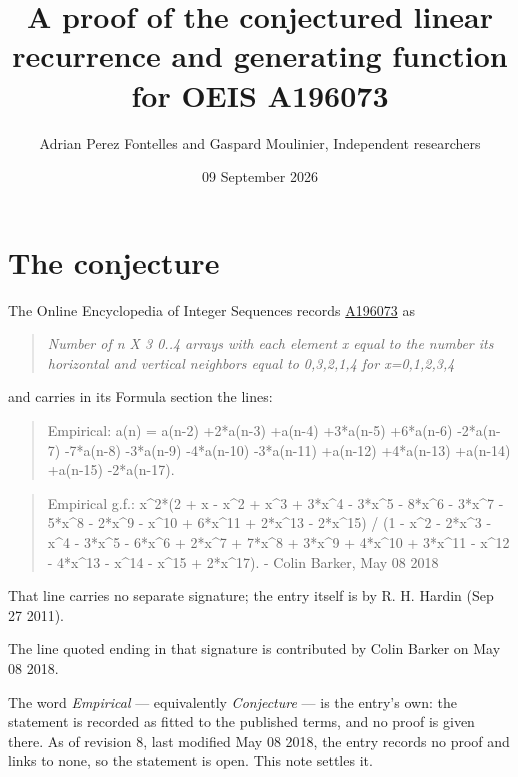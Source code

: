 \documentclass[11pt]{article}
\title{A proof of the conjectured linear recurrence and generating function for OEIS A196073}
\author{Adrian Perez Fontelles and Gaspard Moulinier, Independent researchers}
\date{09 September 2026}
\theoremstyle{definition}
\begin{document}
\maketitle
\section{The conjecture}

The Online Encyclopedia of Integer Sequences records \href{https://oeis.org/A196073}{A196073} as

\begin{quote}\itshape Number of n X 3 0..4 arrays with each element x equal to the number its horizontal and vertical neighbors equal to 0,3,2,1,4 for x=0,1,2,3,4\end{quote}

and carries in its Formula section the lines:

\begin{quote}\ttfamily Empirical: a(n) = a(n-2) +2*a(n-3) +a(n-4) +3*a(n-5) +6*a(n-6) -2*a(n-7) -7*a(n-8) -3*a(n-9) -4*a(n-10) -3*a(n-11) +a(n-12) +4*a(n-13) +a(n-14) +a(n-15) -2*a(n-17).\end{quote}

\begin{quote}\ttfamily Empirical g.f.: x\textasciicircum{}2*(2 + x - x\textasciicircum{}2 + x\textasciicircum{}3 + 3*x\textasciicircum{}4 - 3*x\textasciicircum{}5 - 8*x\textasciicircum{}6 - 3*x\textasciicircum{}7 - 5*x\textasciicircum{}8 - 2*x\textasciicircum{}9 - x\textasciicircum{}10 + 6*x\textasciicircum{}11 + 2*x\textasciicircum{}13 - 2*x\textasciicircum{}15) / (1 - x\textasciicircum{}2 - 2*x\textasciicircum{}3 - x\textasciicircum{}4 - 3*x\textasciicircum{}5 - 6*x\textasciicircum{}6 + 2*x\textasciicircum{}7 + 7*x\textasciicircum{}8 + 3*x\textasciicircum{}9 + 4*x\textasciicircum{}10 + 3*x\textasciicircum{}11 - x\textasciicircum{}12 - 4*x\textasciicircum{}13 - x\textasciicircum{}14 - x\textasciicircum{}15 + 2*x\textasciicircum{}17). - Colin Barker, May 08 2018\end{quote}

That line carries no separate signature; the entry itself is by R. H. Hardin (Sep 27 2011).

The line quoted ending in that signature is contributed by Colin Barker on May 08 2018.

The word {\itshape Empirical} --- equivalently {\itshape Conjecture} --- is the entry's own: the statement is recorded as fitted to the published terms, and no proof is given there. As of revision 8, last modified May 08 2018, the entry records no proof and links to none, so the statement is open. This note settles it.
\end{document}
